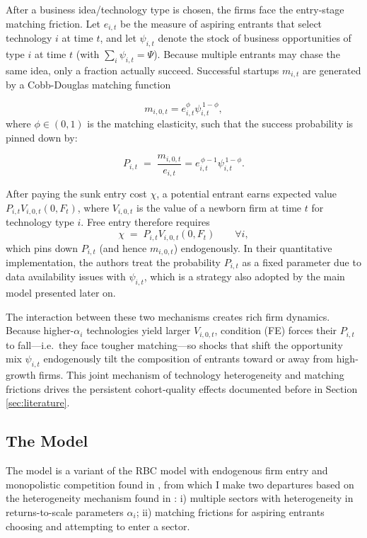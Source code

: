 \documentclass[a4paper,12pt]{article} %
\numberwithin{equation}{section} %
\numberwithin{figure}{section}
\numberwithin{table}{section}
\begin{document}
After a business idea/technology type is chosen, the firms face the entry-stage matching friction. Let $e_{i,t}$ be
the measure of aspiring entrants that select technology $i$ at time $t$, and let $\psi_{i,t}$ denote the stock 
of business opportunities of type $i$ at time $t$ (with $\sum_i\psi_{i,t}=\Psi$). Because multiple entrants may chase the same idea, only
a fraction actually succeed. Successful startups $m_{i,t}$ are generated by a Cobb-Douglas matching function

\[
m_{i,0,t}=e_{i,t}^{\phi}\psi_{i,t}^{\,1-\phi},
\]
where $\phi\in(0,1)$ is the matching elasticity, such that the success probability is pinned down by:

\[
P_{i,t}\;=\;\frac{m_{i,0,t}}{e_{i,t}}=e_{i,t}^{\,\phi-1}\psi_{i,t}^{\,1-\phi}.
\]

After paying the sunk entry cost $\chi$, a potential entrant earns expected value
$P_{i,t}V_{i,0,t}(0,F_t)$, where $V_{i,0,t}$ is the value of a newborn firm at time $t$ for technology type $i$.
Free entry therefore requires
\[
\chi \;=\;P_{i,t}V_{i,0,t}(0,F_t)\qquad\forall i,  \tag{FE}
\]
which pins down $P_{i,t}$ (and hence $m_{i,0,t}$) endogenously. In their quantitative implementation, the authors treat the 
probability $P_{i,t}$ as a fixed parameter due to data availability issues with $\psi_{i,t}$, which is a strategy also adopted
by the main model presented later on.

The interaction between these two mechanisms creates rich firm dynamics. Because higher-$\alpha_i$ technologies yield 
larger $V_{i,0,t}$, condition (FE) forces their $P_{i,t}$ to fall—i.e.\ they face tougher matching—so shocks that 
shift the opportunity mix $\psi_{i,t}$ endogenously tilt the composition of entrants toward or away from high-growth firms. 
This joint mechanism of technology heterogeneity and matching frictions drives the persistent 
cohort‐quality effects documented before in Section \ref{sec:literature}. 

\subsection{The Model}
\label{sec:model-mine}

The model is a variant of the RBC model with endogenous firm entry and monopolistic competition found in \textcite{bilbiie2012endogenous}, from which
I make two departures based on the heterogeneity mechanism found in \textcite{sedlavcek2017growth}: i) multiple sectors with heterogeneity in
returns-to-scale parameters $\alpha_i$; ii) matching frictions for aspiring entrants choosing and attempting to enter a sector.
\end{document}
